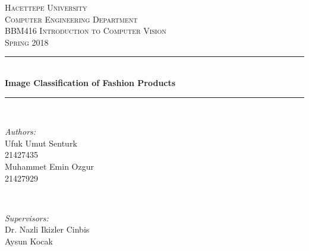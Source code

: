 \documentclass[12pt]{article}
\begin{document}
\begin{titlepage}

\newcommand{\HRule}{\rule{\linewidth}{0.5mm}} %

\center %
 

\textsc{\LARGE Hacettepe University}\\[1.5cm] %
\textsc{\Large Computer Engineering Department}\\[0.5cm] %
\textsc{\large BBM416 Introduction to Computer Vision}\\[0.5cm] %
\textsc{\large Spring 2018}\\[0.5cm]

\HRule \\[0.4cm]
{ \huge \bfseries Image Classification of Fashion Products}\\[0.4cm] %
\HRule \\[1.5cm]
 

\begin{minipage}{0.4\textwidth}
\begin{flushleft} \large
\emph{Authors:}\\
Ufuk Umut Senturk\\21427435 %
\\Muhammet Emin Ozgur\\21427929
\end{flushleft}
\end{minipage}
~
\begin{minipage}{0.4\textwidth}
\begin{flushright} \large
\emph{Supervisors:} \\
Dr. Nazli Ikizler Cinbis\\ %
Aysun Kocak
\end{flushright}
\end{minipage}\\[2cm]


\end{titlepage}
\end{document}
